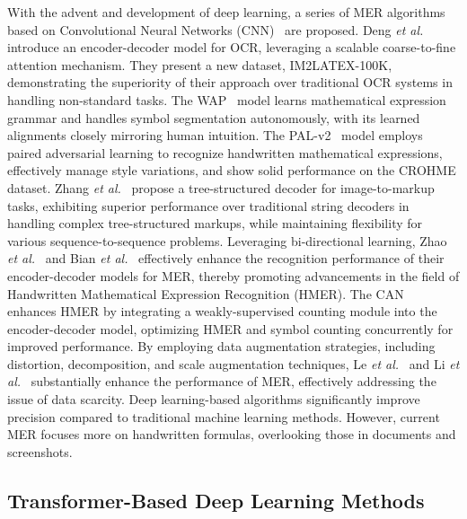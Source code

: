 \documentclass[runningheads]{llncs}
\begin{document}
With the advent and development of deep learning, a series of MER algorithms based on Convolutional Neural Networks (CNN)~\cite{krizhevsky2012imagenet,simonyan2015very} are proposed. Deng \textit{et al.}~\cite{deng2017image} introduce an encoder-decoder model for OCR, leveraging a scalable coarse-to-fine attention mechanism. They present a new dataset, IM2LATEX-100K, demonstrating the superiority of their approach over traditional OCR systems in handling non-standard tasks. The WAP~\cite{zhang2017watch} model learns mathematical expression grammar and handles symbol segmentation autonomously, with its learned alignments closely mirroring human intuition. The PAL-v2~\cite{wu2020handwritten} model employs paired adversarial learning to recognize handwritten mathematical expressions, effectively manage style variations, and show solid performance on the CROHME dataset. Zhang \textit{et al.}~\cite{zhang2020tree} propose a tree-structured decoder for image-to-markup tasks, exhibiting superior performance over traditional string decoders in handling complex tree-structured markups, while maintaining flexibility for various sequence-to-sequence problems. Leveraging bi-directional learning, Zhao \textit{et al.}~\cite{zhao2021handwritten} and Bian \textit{et al.}~\cite{bian2022handwritten} effectively enhance the recognition performance of their encoder-decoder models for MER, thereby promoting advancements in the field of Handwritten Mathematical Expression Recognition (HMER). The CAN~\cite{li2022counting} enhances HMER by integrating a weakly-supervised counting module into the encoder-decoder model, optimizing HMER and symbol counting concurrently for improved performance. By employing data augmentation strategies, including distortion, decomposition, and scale augmentation techniques, Le \textit{et al.}~\cite{le2019pattern} and Li \textit{et al.}~\cite{li2020improving} substantially enhance the performance of MER, effectively addressing the issue of data scarcity. Deep learning-based algorithms significantly improve precision compared to traditional machine learning methods. However, current MER focuses more on handwritten formulas, overlooking those in documents and screenshots.

\subsection{Transformer-Based Deep Learning Methods}
\end{document}
